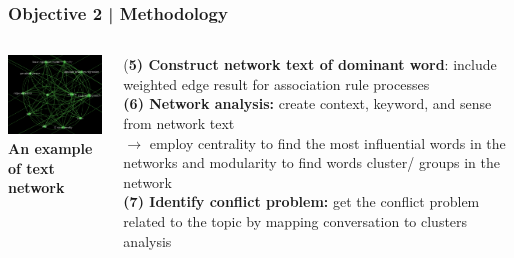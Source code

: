 \documentclass{beamer}
\begin{document}
\begin{frame}
\frametitle{Objective 2 | Methodology}
\begin{columns}
	\begin{column}{.35\textwidth}
		\includegraphics[width=40mm]{nw.png}\\
{\scriptsize 	\textbf{An example of text network}}
	\end{column}

	\begin{column}{.60\textwidth}
(\textbf{5) Construct network text of dominant word}: include weighted edge result for association rule processes\\
\textbf{(6) Network analysis:} create context, keyword, and sense from network text\\
$\rightarrow$ employ centrality to find the most influential words in the networks and modularity to find words cluster/ groups in the network \\
\textbf{(7) Identify conflict problem:} get the conflict problem related to the topic by mapping conversation to clusters analysis\\
	\end{column}
\end{columns}
\end{frame}
\end{document}
